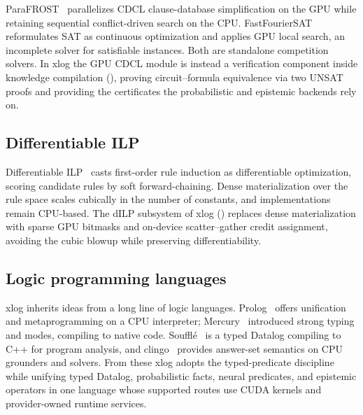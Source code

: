 ParaFROST~\cite{parafrost} parallelizes CDCL clause-database simplification on the GPU while retaining sequential conflict-driven search on the CPU. FastFourierSAT~\cite{fastfouriersat} reformulates SAT as continuous optimization and applies GPU local search, an incomplete solver for satisfiable instances. Both are standalone competition solvers. In xlog the GPU CDCL module is instead a verification component inside knowledge compilation (), proving circuit--formula equivalence via two UNSAT proofs and providing the certificates the probabilistic and epistemic backends rely on.

\subsection{Differentiable ILP}

Differentiable ILP~\cite{dilp} casts first-order rule induction as differentiable optimization, scoring candidate rules by soft forward-chaining. Dense materialization over the rule space scales cubically in the number of constants, and implementations remain CPU-based. The dILP subsystem of xlog () replaces dense materialization with sparse GPU bitmasks and on-device scatter--gather credit assignment, avoiding the cubic blowup while preserving differentiability.

\subsection{Logic programming languages}

xlog inherits ideas from a long line of logic languages. Prolog~\cite{swiprolog} offers unification and metaprogramming on a CPU interpreter; Mercury~\cite{mercury} introduced strong typing and modes, compiling to native code. Souffl{\'e}~\cite{souffle} is a typed Datalog compiling to C++ for program analysis, and clingo~\cite{clingo} provides answer-set semantics on CPU grounders and solvers. From these xlog adopts the typed-predicate discipline while unifying typed Datalog, probabilistic facts, neural predicates, and epistemic operators in one language whose supported routes use CUDA kernels and provider-owned runtime services.
